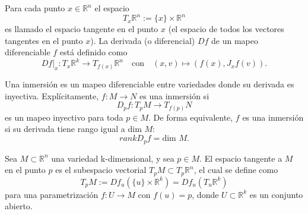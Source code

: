 \documentclass[spanish]{beamer}
\def\realR{\mathbb{R}} %
\begin{document}
\begin{frame}
    \begin{definition}[Espacio tangente a $\realR^{n}$]
        Para cada punto $x \in \realR^{n}$ el espacio
        $$ T_{x}\realR^{n} := \{x\} \times \realR^{n} $$
        es llamado el espacio tangente en el punto $x$ (el espacio de todos los vectores
        tangentes en el punto $x$). La derivada (o diferencial) $Df$ de un mapeo diferenciable
        $f$ est\'a definido como
        $$ Df|_{x}: T_{x}\realR^{k} \rightarrow T_{f(x)}\realR^{n} \quad \text{con} \quad
        (x,v) \mapsto (f(x),J_{x}f(v)) \text{.} $$
    \end{definition}
\end{frame}

\begin{frame}
    \begin{definition}\label{def:immersion}
        Una inmersi\'on es un mapeo diferenciable entre variedades donde su
        derivada es inyectiva. Expl\'icitamente, $f:M \rightarrow N$ es una inmersi\'on si
        $$ D_{p}f: T_{p}M \rightarrow T_{f(p)}N $$
        es un mapeo inyectivo para toda $p \in M$. De forma equivalente, $f$ es una inmersi\'on
        si su derivada tiene rango igual a dim $M$:
        $$ rank D_{p}f = \text{dim }M \text{.} $$
    \end{definition}
\end{frame}

\begin{frame}
    \begin{definition}
        Sea $M \subset \realR^{n}$ una variedad k-dimensional, y sea $p \in M$. El
        espacio tangente a $M$ en el punto $p$ es el subespacio vectorial $T_{p}M \subset T_{p}\realR^{n}$,
        el cual se define como
        $$ T_{p}M := Df_{u}(\{u\} \times \realR^{k})=Df_{u}(T_{u}\realR^{k}) $$
        para una parametrizaci\'on $f:U \rightarrow M$ con $f(u) = p$, donde $U \subset \realR^{k}$ es
        un conjunto abierto.
    \end{definition}
\end{frame}
\end{document}
